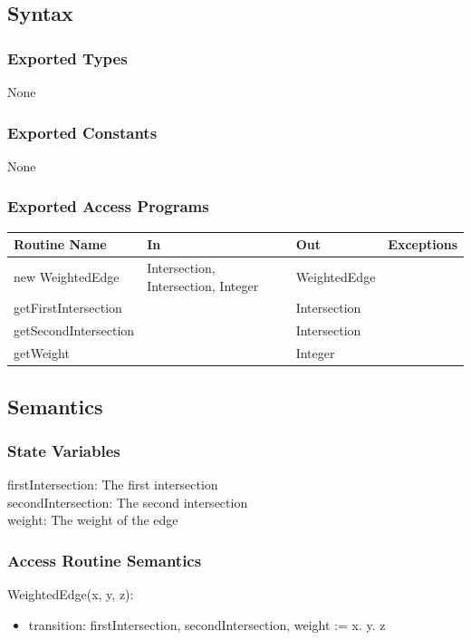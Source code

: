 \documentclass[12pt]{article}
\begin{document}
\subsection*{Syntax}
\subsubsection*{Exported Types}
None

\subsubsection*{Exported Constants}
None

\subsubsection*{Exported Access Programs}
    \begin{tabular}{|l|l|l|l|}
    \hline
    \textbf{Routine Name} & \textbf{In} & \textbf{Out} & \textbf{Exceptions}\\
    \hline
    new WeightedEdge & Intersection, Intersection, Integer & WeightedEdge & ~\\
    \hline
    getFirstIntersection & ~ & Intersection  & ~\\
    \hline
    getSecondIntersection & ~ & Intersection  & ~\\
    \hline
    getWeight & ~ & Integer  & ~\\
    \hline
    \end{tabular}
    
\subsection*{Semantics}
\subsubsection*{State Variables}
firstIntersection: The first intersection\\
secondIntersection: The second intersection\\
weight: The weight of the edge

\newpage
\subsubsection*{Access Routine Semantics}
\noindent WeightedEdge(x, y, z):
\begin{itemize}
    \item transition: firstIntersection, secondIntersection, weight := x. y. z
\end{itemize}
\end{document}
